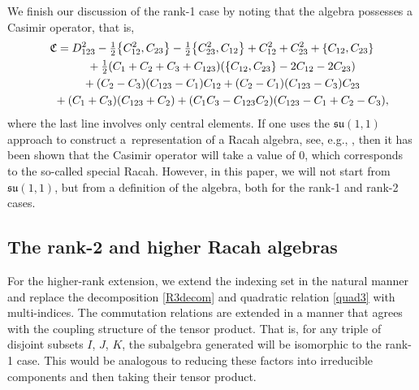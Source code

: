 \documentclass[pdftex]{sigma}
\numberwithin{equation}{section}
\begin{document}
 We finish our discussion of the rank-1 case by noting that the algebra possesses a Casimir operator, that is,
\begin{gather}
\mathfrak{C}= D_{123}^2-\tfrac{1}{2}\big\lbrace C_{12}^2,C_{23}\big\rbrace-\tfrac{1}{2}\big\lbrace C_{23}^2,C_{12}\big\rbrace+C_{12}^2+C_{23}^2+\lbrace C_{12},C_{23}\rbrace\nonumber\\
\hphantom{\mathfrak{C}=}{}+\tfrac{1}{2}(C_1+C_2+C_3+C_{123})(\lbrace C_{12},C_{23}\rbrace-2C_{12}-2C_{23})\nonumber\\
\hphantom{\mathfrak{C}=}{}+(C_2-C_3)(C_{123}-C_1)C_{12}+(C_2-C_1)(C_{123}-C_3)C_{23}\nonumber\\
\hphantom{\mathfrak{C}=}{}+(C_1+C_3)(C_{123}+C_2)+(C_1C_3-C_{123}C_2)(C_{123}-C_1+C_2-C_3),\label{Casmir1}
\end{gather}
where the last line involves only central elements. If one uses the $\mathfrak{su}(1,1)$ approach to construct a~representation of a Racah algebra, see, e.g., \cite{GVZ2013}, then it has been shown that the Casimir operator will take a value of 0, which corresponds to the so-called special Racah. However, in this paper, we will not start from $\mathfrak{su}(1,1)$, but from a definition of the algebra, both for the rank-1 and rank-2 cases.





\subsection{The rank-2 and higher Racah algebras}

For the higher-rank extension, we extend the indexing set in the natural manner and replace the decomposition \eqref{R3decom} and quadratic relation \eqref{quad3} with multi-indices. The commutation relations are extended in a manner that agrees with the coupling structure of the tensor product. That is, for any triple of disjoint subsets $I$, $J$, $K$, the subalgebra generated will be isomorphic to the rank-1 case. This would be analogous to reducing these factors into irreducible components and then taking their tensor product.
\end{document}
